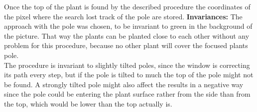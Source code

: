 Once the top of the plant is found by the described procedure the coordinates of the pixel where the search lost track of the pole are stored.
\textbf{Invariances:} The approach with the pole was chosen, to be invariant to green in the background of the picture. That way the plants can be planted close to each other without any problem for this procedure, because no other plant will cover the focused plants pole.\\
The procedure is invariant to slightly tilted poles, since the window is correcting its path every step, but if the pole is tilted to much the top of the pole might not be found. A strongly tilted pole might also affect the results in a negative way since the pole could be entering the plant surface rather from the side than from the top, which would be lower than the top actually is.

